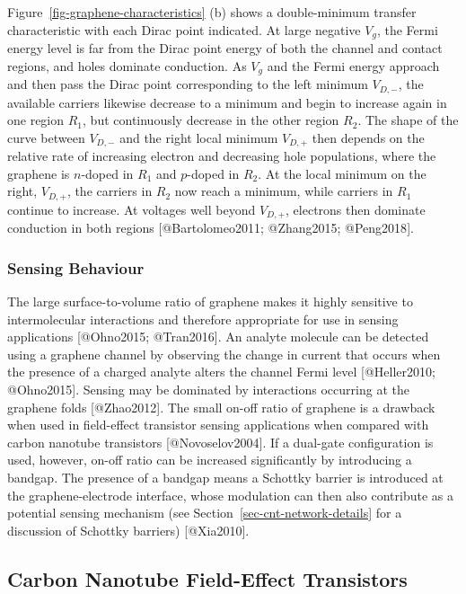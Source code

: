 \documentclass[
  letterpaper,
  DIV=11,
  numbers=noendperiod]{scrartcl}
\begin{document}
Figure~\ref{fig-graphene-characteristics} (b) shows a double-minimum
transfer characteristic with each Dirac point indicated. At large
negative \(V_g\), the Fermi energy level is far from the Dirac point
energy of both the channel and contact regions, and holes dominate
conduction. As \(V_g\) and the Fermi energy approach and then pass the
Dirac point corresponding to the left minimum \(V_{D,-}\), the available
carriers likewise decrease to a minimum and begin to increase again in
one region \(R_1\), but continuously decrease in the other region
\(R_2\). The shape of the curve between \(V_{D,-}\) and the right local
minimum \(V_{D,+}\) then depends on the relative rate of increasing
electron and decreasing hole populations, where the graphene is
\(n\)-doped in \(R_1\) and \(p\)-doped in \(R_2\). At the local minimum
on the right, \(V_{D,+}\), the carriers in \(R_2\) now reach a minimum,
while carriers in \(R_1\) continue to increase. At voltages well beyond
\(V_{D,+}\), electrons then dominate conduction in both regions
{[}@Bartolomeo2011; @Zhang2015; @Peng2018{]}.

\subsubsection{Sensing Behaviour}\label{sensing-behaviour}

The large surface-to-volume ratio of graphene makes it highly sensitive
to intermolecular interactions and therefore appropriate for use in
sensing applications {[}@Ohno2015; @Tran2016{]}. An analyte molecule can
be detected using a graphene channel by observing the change in current
that occurs when the presence of a charged analyte alters the channel
Fermi level {[}@Heller2010; @Ohno2015{]}. Sensing may be dominated by
interactions occurring at the graphene folds {[}@Zhao2012{]}. The small
on-off ratio of graphene is a drawback when used in field-effect
transistor sensing applications when compared with carbon nanotube
transistors {[}@Novoselov2004{]}. If a dual-gate configuration is used,
however, on-off ratio can be increased significantly by introducing a
bandgap. The presence of a bandgap means a Schottky barrier is
introduced at the graphene-electrode interface, whose modulation can
then also contribute as a potential sensing mechanism (see
Section~\ref{sec-cnt-network-details} for a discussion of Schottky
barriers) {[}@Xia2010{]}.

\subsection{Carbon Nanotube Field-Effect
Transistors}\label{carbon-nanotube-field-effect-transistors}
\end{document}

